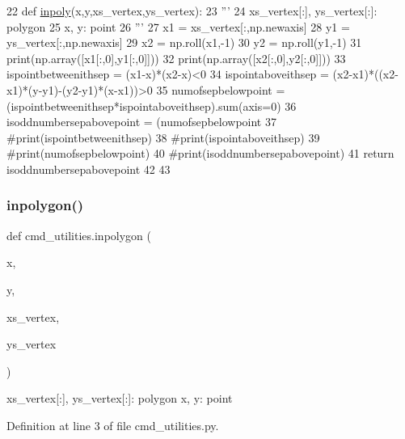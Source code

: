 \begin{DoxyCode}
22 \textcolor{keyword}{def }\hyperlink{namespacecmd__utilities_ad7c7b1221baf98a83c4fd558b214c7bc}{inpoly}(x,y,xs\_vertex,ys\_vertex):
23     \textcolor{stringliteral}{''' }
24 \textcolor{stringliteral}{    xs\_vertex[:], ys\_vertex[:]: polygon}
25 \textcolor{stringliteral}{    x, y: point}
26 \textcolor{stringliteral}{    '''}
27     x1 = xs\_vertex[:,np.newaxis]
28     y1 = ys\_vertex[:,np.newaxis]
29     x2 = np.roll(x1,-1)
30     y2 = np.roll(y1,-1)
31     print(np.array([x1[:,0],y1[:,0]]))
32     print(np.array([x2[:,0],y2[:,0]]))
33     ispointbetweenithsep = (x1-x)*(x2-x)<0
34     ispointaboveithsep = (x2-x1)*((x2-x1)*(y-y1)-(y2-y1)*(x-x1))>0
35     numofsepbelowpoint = (ispointbetweenithsep*ispointaboveithsep).sum(axis=0)
36     isoddnumbersepabovepoint = (numofsepbelowpoint%
37     \textcolor{comment}{#print(ispointbetweenithsep)}
38     \textcolor{comment}{#print(ispointaboveithsep)}
39     \textcolor{comment}{#print(numofsepbelowpoint)}
40     \textcolor{comment}{#print(isoddnumbersepabovepoint)}
41     \textcolor{keywordflow}{return} isoddnumbersepabovepoint
42 
43 \end{DoxyCode}
\mbox{\label{namespacecmd__utilities_a016d198d084cbddc117765f2db6169db}} 
\subsubsection{\texorpdfstring{inpolygon()}{inpolygon()}}
{\footnotesize\ttfamily def cmd\+\_\+utilities.\+inpolygon (\begin{DoxyParamCaption}\item[{}]{x,  }\item[{}]{y,  }\item[{}]{xs\+\_\+vertex,  }\item[{}]{ys\+\_\+vertex }\end{DoxyParamCaption})}

\begin{DoxyVerb}xs_vertex[:], ys_vertex[:]: polygon
x, y: point
\end{DoxyVerb}
 

Definition at line 3 of file cmd\+\_\+utilities.\+py.


